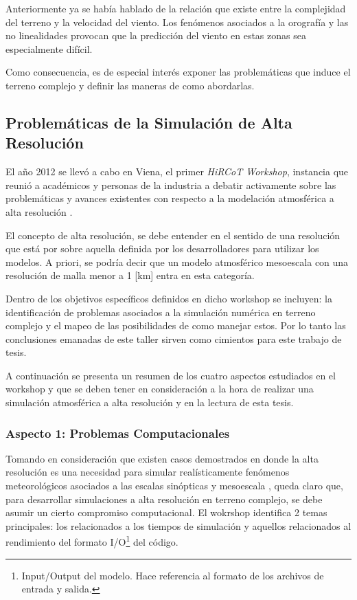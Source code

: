 Anteriormente ya se había hablado de la relación que existe entre la complejidad del terreno y la velocidad del viento. Los fenómenos asociados a la orografía y las no linealidades provocan que la predicción del viento en estas zonas sea especialmente difícil. 

Como consecuencia, es de especial interés exponer las problemáticas que induce el terreno complejo y definir las maneras de como abordarlas.
\subsection{Problemáticas de la Simulación de Alta Resolución}
El año 2012 se llevó a cabo en Viena, el primer \emph{HiRCoT Workshop}, instancia que reunió a académicos y personas de la industria a debatir activamente sobre las problemáticas y avances existentes con respecto a la modelación atmosférica a alta resolución \citep{arnold2012high}.

El concepto de alta resolución, se debe entender en el sentido de una resolución que está por sobre aquella definida por los desarrolladores para utilizar los modelos. A priori, se podría decir que un modelo atmosférico mesoescala con una resolución de malla menor a 1 [km] entra en esta categoría.

Dentro de los objetivos específicos definidos en dicho workshop se incluyen: la identificación de problemas asociados a la simulación numérica en terreno complejo y el mapeo de las posibilidades de como manejar estos. Por lo tanto las conclusiones emanadas de este taller sirven como cimientos para este trabajo de tesis.

A continuación se presenta un resumen de los cuatro aspectos estudiados en el workshop y que se deben tener en consideración a la hora de realizar una simulación atmosférica a alta resolución y en la lectura de esta tesis.

\subsubsection{Aspecto 1: Problemas Computacionales}
Tomando en consideración que existen casos demostrados en donde la alta resolución es una necesidad para simular realísticamente fenómenos meteorológicos asociados a las escalas sinópticas y mesoescala \citep{morton2007tradeoffs,stevens2010using}, queda claro que, para desarrollar simulaciones a alta resolución en terreno complejo, se debe asumir un cierto compromiso computacional. El wokrshop identifica 2 temas principales: los relacionados a los tiempos de simulación y aquellos relacionados al rendimiento del formato I/O\footnote{Input/Output del modelo. Hace referencia al formato de los archivos de entrada y salida.} del código.

